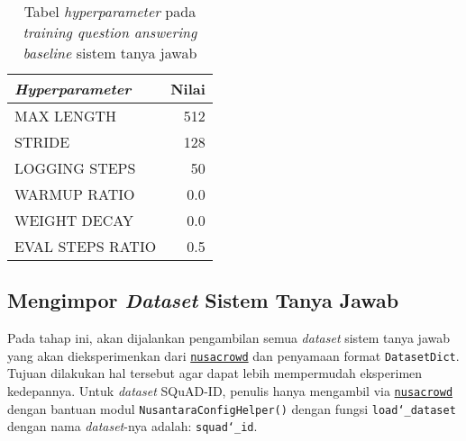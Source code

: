 \begin{table}[h]
\centering
\begin{tabular}{lr} 
 \toprule
 \emph{Hyperparameter} & Nilai \\ [0.5ex] 
 \midrule
 MAX LENGTH & 512 \\ 
 STRIDE & 128 \\
 LOGGING STEPS & 50 \\
 WARMUP RATIO & 0.0 \\
 WEIGHT DECAY & 0.0 \\ 
 EVAL STEPS RATIO & 0.5 \\ [1ex] 
 \bottomrule
\end{tabular}
\caption{Tabel \emph{hyperparameter} pada \emph{training question answering} \emph{baseline} sistem tanya jawab}
\end{table}

\subsection{Mengimpor \emph{Dataset} Sistem Tanya Jawab}
\label{4.2.3}
Pada tahap ini, akan dijalankan pengambilan semua \emph{dataset} sistem tanya jawab yang akan dieksperimenkan dari \href{https://github.com/IndoNLP/nusa-crowd/tree/master/nusacrowd/nusa_datasets/}{\texttt{nusacrowd}} dan penyamaan format \texttt{DatasetDict}. Tujuan dilakukan hal tersebut agar dapat lebih mempermudah eksperimen kedepannya. Untuk \emph{dataset} SQuAD-ID, penulis hanya mengambil via \href{https://github.com/IndoNLP/nusa-crowd/tree/master/nusacrowd/nusa_datasets/}{\texttt{nusacrowd}} dengan bantuan modul \texttt{NusantaraConfigHelper()} dengan fungsi \texttt{load\char`_dataset} dengan nama \emph{dataset}-nya adalah: \texttt{squad\char`_id}. 

